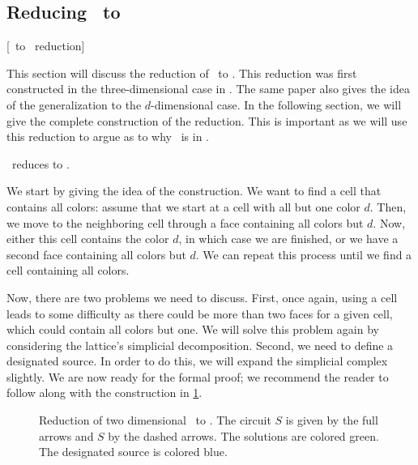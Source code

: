 
\subsection{Reducing \Sperner\ to \EndOfLine}[\Sperner\ to \EndOfLine\ reduction]
\label{sec:sperner_eol_reduction}

This section will discuss the reduction of \Sperner\ to \EndOfLine. This reduction was first constructed in the three-dimensional case in . The same paper also gives the idea of the generalization to the $d$-dimensional case. In the following section, we will give the complete construction of the reduction. This is important as we will use this reduction to argue as to why \Tarskistar\ is in \EOPL.

\begin{theorem}
	\Sperner\ reduces to \EndOfLine.
\end{theorem}

We start by giving the idea of the construction. We want to find a cell that contains all colors: assume that we start at a cell with all but one color $d$. Then, we move to the neighboring cell through a face containing all colors but $d$. Now, either this cell contains the color $d$, in which case we are finished, or we have a second face containing all colors but $d$. We can repeat this process until we find a cell containing all colors.


Now, there are two problems we need to discuss. First, once again, using a cell leads to some difficulty as there could be more than two faces for a given cell, which could contain all colors but one. We will solve this problem again by considering the lattice's simplicial decomposition. Second, we need to define a designated source. In order to do this, we will expand the simplicial complex slightly. We are now ready for the formal proof; we recommend the reader to follow along with the construction in \cref{fig:sperner_eol_reduction}.

\begin{figure}
	\centering
	\caption[Reduction of \Sperner\ to \EndOfLine]{Reduction of two dimensional \Sperner\ to \EndOfLine. The circuit $S$ is given by the full arrows and $S$ by the dashed arrows. The solutions are colored green. The designated source is colored blue.}
	\label{fig:sperner_eol_reduction}
\end{figure}

